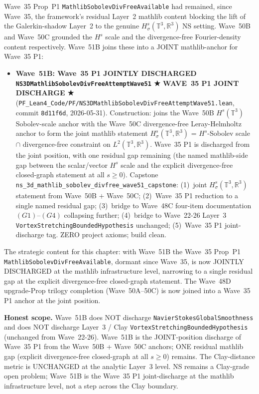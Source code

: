 \begin{remark}\label{rem:ns-wave51b-lean}
Wave~35 Prop~P1 \texttt{MathlibSobolevDivFreeAvailable} had remained, since Wave~35, the framework's residual Layer~2 mathlib content blocking the lift of the Galerkin-shadow Layer~2 to the genuine $H^s_\sigma(\mathbb{T}^3, \mathbb{R}^3)$ NS setting. Wave~50B and Wave~50C grounded the $H^s$ scale and the divergence-free Fourier-density content respectively. Wave~51B joins these into a JOINT mathlib-anchor for Wave~35 P1:
\begin{itemize}
  \item \textbf{Wave~51B: Wave~35 P1 JOINTLY DISCHARGED \texttt{NS3DMathlibSobolevDivFreeAttemptWave51} ★ WAVE~35 P1 JOINT DISCHARGE ★} (\texttt{PF\_Lean4\_Code/PF/NS3DMathlibSobolevDivFreeAttemptWave51.lean}, commit \texttt{8d11f6d}, 2026-05-31). Construction: joins the Wave~50B $H^s(\mathbb{T}^3)$ Sobolev-scale anchor with the Wave~50C divergence-free Leray-Helmholtz anchor to form the joint mathlib statement $H^s_\sigma(\mathbb{T}^3, \mathbb{R}^3)$ = $H^s$-Sobolev scale $\cap$ divergence-free constraint on $L^2(\mathbb{T}^3, \mathbb{R}^3)$. Wave~35 P1 is discharged from the joint position, with one residual gap remaining (the named mathlib-side gap between the scalar/vector $H^s$ scale and the explicit divergence-free closed-graph statement at all $s \geq 0$). Capstone \texttt{ns\_3d\_mathlib\_sobolev\_divfree\_wave51\_capstone}: (1)~joint $H^s_\sigma(\mathbb{T}^3, \mathbb{R}^3)$ statement from Wave~50B $+$ Wave~50C; (2)~Wave~35 P1 reduction to a single named residual gap; (3)~bridge to Wave~48C four-item documentation $(G1)$--$(G4)$ collapsing further; (4)~bridge to Wave~22-26 Layer~3 \texttt{VortexStretchingBoundedHypothesis} unchanged; (5)~Wave~35 P1 joint-discharge tag. ZERO project axioms; build clean.
\end{itemize}
The strategic content for this chapter: with Wave~51B the Wave~35 Prop~P1 \texttt{MathlibSobolevDivFreeAvailable}, dormant since Wave~35, is now JOINTLY DISCHARGED at the mathlib infrastructure level, narrowing to a single residual gap at the explicit divergence-free closed-graph statement. The Wave~48D upgrade-Prop trilogy completion (Wave~50A--50C) is now joined into a Wave~35 P1 anchor at the joint position.

\textbf{Honest scope.} Wave~51B does NOT discharge \texttt{NavierStokesGlobalSmoothness} and does NOT discharge Layer~3 / Clay \texttt{VortexStretchingBoundedHypothesis} (unchanged from Wave~22-26). Wave~51B is the JOINT-position discharge of Wave~35 P1 from the Wave~50B + Wave~50C anchors; ONE residual mathlib gap (explicit divergence-free closed-graph at all $s \geq 0$) remains. The Clay-distance metric is UNCHANGED at the analytic Layer~3 level. NS remains a Clay-grade open problem; Wave~51B is the Wave~35 P1 joint-discharge at the mathlib infrastructure level, not a step across the Clay boundary.
\end{remark}

